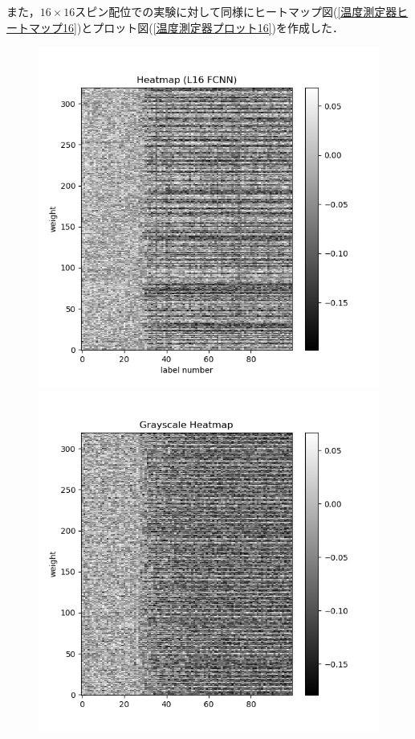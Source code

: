 \documentclass[a4paper,11pt]{jsreport}
\begin{document}
また，$16 \times 16$スピン配位での実験に対して同様にヒートマップ図(\ref{温度測定器ヒートマップ16})とプロット図(\ref{温度測定器プロット16})を作成した．

\begin{figure}[H]
  \begin{minipage}[b]{0.45\linewidth}
    \begin{center}
      \includegraphics[keepaspectratio, scale=0.5]{image/L16_FCNN_weight.png}
    \end{center}
  \end{minipage}
  \begin{minipage}[b]{0.45\linewidth}
    \begin{center}
      \includegraphics[keepaspectratio, scale=0.5]{image/L16_CNN_weight_2.png}

\end{center}
\end{minipage}
\end{figure}
\end{document}
